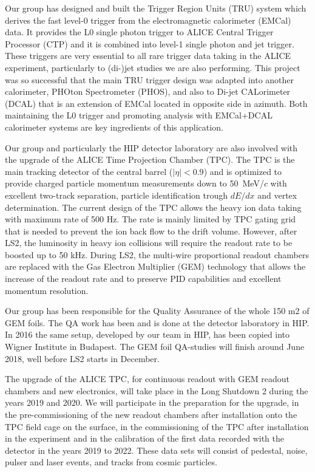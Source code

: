 Our group has designed and built the Trigger Region Units (TRU) system which derives the fast level-0 trigger from the electromagnetic calorimeter (EMCal) data. It provides the L0 single photon trigger to ALICE Central Trigger Processor (CTP) and it is combined into level-1 single photon and jet trigger. These triggers are very essential to all rare trigger data taking in the ALICE experiment, particularly to (di-)jet studies we are also performing. This project was so successful that the main TRU trigger design was adapted into another calorimeter, PHOton Spectrometer (PHOS), and also to Di-jet CALorimeter (DCAL) that is an extension of EMCal located in opposite side in azimuth. Both maintaining the L0 trigger and promoting analysis with EMCal+DCAL calorimeter systems are key ingredients of this application.

Our group and particularly the HIP detector laboratory are also involved with the upgrade of the ALICE Time Projection Chamber (TPC). The TPC is the main tracking detector of the central barrel ($|\eta|<0.9$) and is optimized to provide charged particle momentum measurements down to 50~MeV/$c$ with excellent two-track separation, particle identification trough $dE/dx$ and vertex determination. The current design of the TPC allows the heavy ion data taking with maximum rate of 500 Hz. The rate is mainly limited by TPC gating grid that is needed to prevent the ion back flow to the drift volume. 
However, after LS2, the luminosity in heavy ion collisions will require the readout rate to be boosted up to 50 kHz. 
During LS2,  the multi-wire proportional readout chambers are replaced with the Gas Electron Multiplier (GEM) technology that allows the increase of the readout rate and to preserve PID capabilities and excellent momentum resolution.

Our group has been responsible for the Quality Assurance of the whole 150 m2 of GEM foils. The QA work has been and is done at the detector laboratory in HIP. In 2016 the same setup, developed by our team in HIP, has been copied into Wigner Institute in Budapest. The GEM foil QA-studies will finish around June 2018, well before LS2 starts in December.

The upgrade of the ALICE TPC, for continuous readout with GEM readout chambers and new electronics, will take place in the Long Shutdown 2 during the years 2019 and 2020. We will participate in the preparation for the upgrade, in the pre-commissioning of the new readout chambers after installation onto the TPC field cage on the surface, in the commissioning of the TPC after installation in the experiment and in the calibration of the first data recorded with the detector in the years 2019 to 2022. These data sets will consist of pedestal, noise, pulser and laser events, and tracks from cosmic particles. 

